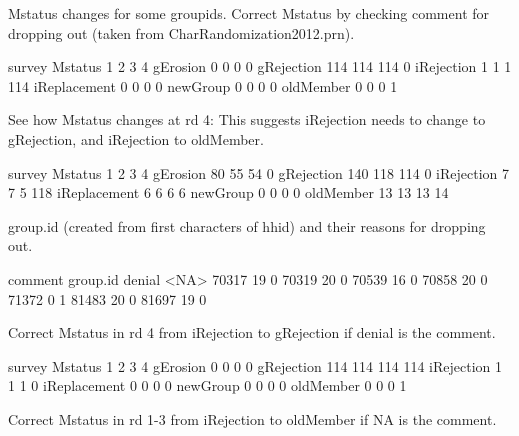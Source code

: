 \textsf{Mstatus} changes for some \textsf{groupid}s. Correct \textsf{Mstatus} by checking \textsf{comment} for dropping out (taken from CharRandomization2012.prn).
\begin{Schunk}
\begin{Soutput}
              survey
Mstatus          1   2   3   4
  gErosion       0   0   0   0
  gRejection   114 114 114   0
  iRejection     1   1   1 114
  iReplacement   0   0   0   0
  newGroup       0   0   0   0
  oldMember      0   0   0   1
\end{Soutput}
\end{Schunk}
See how \textsf{Mstatus} changes at rd 4: This suggests \textsf{iRejection} needs to change to \textsf{gRejection}, and \textsf{iRejection} to \textsf{oldMember}.
\begin{Schunk}
\begin{Soutput}
              survey
Mstatus          1   2   3   4
  gErosion      80  55  54   0
  gRejection   140 118 114   0
  iRejection     7   7   5 118
  iReplacement   6   6   6   6
  newGroup       0   0   0   0
  oldMember     13  13  13  14
\end{Soutput}
\end{Schunk}
\textsf{group.id} (created from first characters of \textsf{hhid}) and their reasons for dropping out.
\begin{Schunk}
\begin{Soutput}
        comment
group.id denial <NA>
   70317     19    0
   70319     20    0
   70539     16    0
   70858     20    0
   71372      0    1
   81483     20    0
   81697     19    0
\end{Soutput}
\end{Schunk}
Correct \textsf{Mstatus} in rd 4 from \textsf{iRejection} to \textsf{gRejection} if denial is the \textsf{comment}. \gobblepars
\begin{Schunk}
\begin{Soutput}
              survey
Mstatus          1   2   3   4
  gErosion       0   0   0   0
  gRejection   114 114 114 114
  iRejection     1   1   1   0
  iReplacement   0   0   0   0
  newGroup       0   0   0   0
  oldMember      0   0   0   1
\end{Soutput}
\end{Schunk}
Correct \textsf{Mstatus} in rd 1-3 from \textsf{iRejection} to \textsf{oldMember} if NA is the \textsf{comment}. \gobblepars
